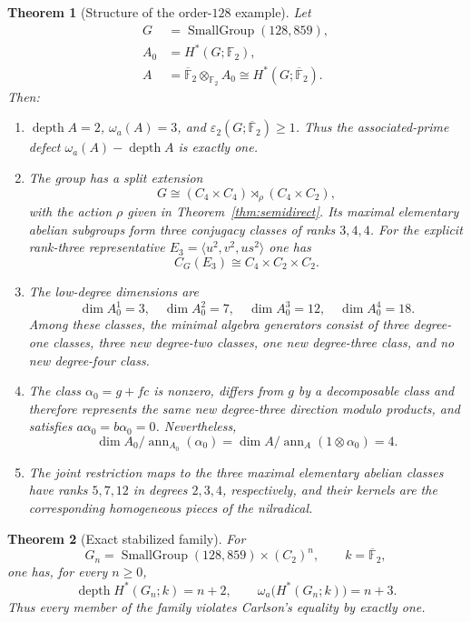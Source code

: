 \documentclass[11pt]{amsart}
\newtheorem{theorem}{Theorem}[section]
\theoremstyle{definition}
\theoremstyle{remark}
\DeclareMathOperator{\depth}{depth}
\DeclareMathOperator{\ann}{ann}
\newcommand{\F}{\mathbb F}
\newcommand{\kbar}{\overline{\mathbb F}_{2}}
\newcommand{\SG}[2]{\operatorname{SmallGroup}(#1,#2)}
\begin{document}
\begin{theorem}[Structure of the order-$128$ example]
\label{thm:intro-synthesis}
Let
\[
\begin{aligned}
G&=\SG{128}{859},\\
A_0&=H^*(G;\F_2),\\
A&=\kbar\otimes_{\F_2}A_0
  \cong H^*(G;\kbar).
\end{aligned}
\]
Then:
\begin{enumerate}[label=\textup{(\alph*)}]
\item $\depth A=2$, $\omega_a(A)=3$, and $\varepsilon_2(G;\kbar)\geq1$.  Thus the associated-prime defect $\omega_a(A)-\depth A$ is exactly one.
\item The group has a split extension
\[
G\cong(C_4\times C_4)\rtimes_\rho(C_4\times C_2),
\]
with the action $\rho$ given in Theorem~\ref{thm:semidirect}.  Its maximal elementary abelian subgroups form three conjugacy classes of ranks $3,4,4$.  For the explicit rank-three representative $E_3=\langle u^2,v^2,us^2\rangle$ one has
\[
C_G(E_3)\cong C_4\times C_2\times C_2.
\]
\item The low-degree dimensions are
\[
\dim A_0^1=3,
\quad
\dim A_0^2=7,
\quad
\dim A_0^3=12,
\quad
\dim A_0^4=18.
\]
Among these classes, the minimal algebra generators consist of three degree-one classes, three new degree-two classes, one new degree-three class, and no new degree-four class.
\item The class $\alpha_0=g+fc$ is nonzero, differs from $g$ by a decomposable class and therefore represents the same new degree-three direction modulo products, and satisfies $a\alpha_0=b\alpha_0=0$.  Nevertheless,
\[
\dim A_0/\ann_{A_0}(\alpha_0)
=
\dim A/\ann_A(1\otimes\alpha_0)
=4.
\]
\item The joint restriction maps to the three maximal elementary abelian classes have ranks $5,7,12$ in degrees $2,3,4$, respectively, and their kernels are the corresponding homogeneous pieces of the nilradical.
\end{enumerate}
\end{theorem}

\begin{theorem}[Exact stabilized family]
\label{thm:intro-exact-family}
For
\[
G_n=\SG{128}{859}\times(C_2)^n,
\qquad k=\kbar,
\]
one has, for every $n\geq0$,
\[
\depth H^*(G_n;k)=n+2,
\qquad
\omega_a\bigl(H^*(G_n;k)\bigr)=n+3.
\]
Thus every member of the family violates Carlson's equality by exactly one.
\end{theorem}
\end{document}
